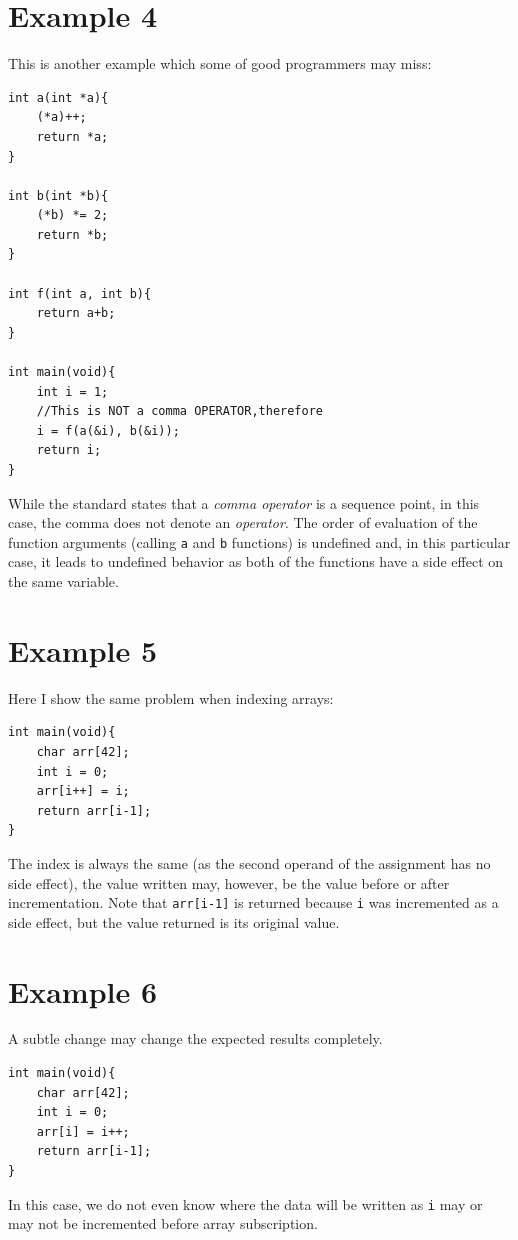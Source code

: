 \section{Example 4}\label{example4}
This is another example which some of good programmers may miss:
\begin{lstlisting}
int a(int *a){
    (*a)++;
    return *a;
}

int b(int *b){
    (*b) *= 2;
    return *b;
}

int f(int a, int b){
    return a+b;
}

int main(void){
    int i = 1;
    //This is NOT a comma OPERATOR,therefore
    i = f(a(&i), b(&i));
    return i;
}
\end{lstlisting}
While the standard states that a \emph{comma operator} is a sequence point, in this case, the comma does not denote an \emph{operator}. The order of evaluation of the function arguments (calling \verb|a| and \verb|b| functions) is undefined and, in this particular case, it leads to undefined behavior as both of the functions have a side effect on the same variable.

\section{Example 5}\label{example5}
Here I show the same problem when indexing arrays:
\begin{lstlisting}
int main(void){
    char arr[42];
    int i = 0;
    arr[i++] = i;
    return arr[i-1];
}
\end{lstlisting}
The index is always the same (as the second operand of the assignment has no side effect), the value written may, however, be the value before or after incrementation. Note that \verb|arr[i-1]| is returned because \verb|i| was incremented as a side effect, but the value returned is its original value.

\section{Example 6}\label{example6}
A subtle change may change the expected results completely.
\begin{lstlisting}
int main(void){
    char arr[42];
    int i = 0;
    arr[i] = i++;
    return arr[i-1];
}
\end{lstlisting}
In this case, we do not even know where the data will be written as \verb|i| may or may not be incremented before array subscription.

